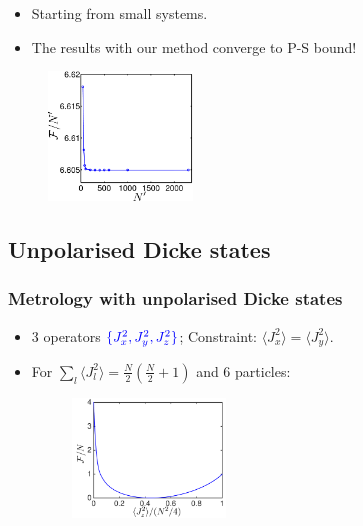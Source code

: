 \documentclass{beamer}
\newcommand{\expect}[1]{\ensuremath{\langle #1 \rangle}}
\begin{document}
		\begin{frame}

			\begin{itemize}
				\item Starting from small systems.
				\vspace{5px}
				\item The results with our method converge to P-S bound!
			\end{itemize}
			\begin{figure}
				\includegraphics[height=130px]{img/scaling-spsq.pdf}
			\end{figure}

		\end{frame}

	\subsection{Unpolarised Dicke states}

		\begin{frame}
			\frametitle{Metrology with unpolarised Dicke states}
			\begin{itemize}
				\item<1-> 3 operators $\color{blue}\{J_x^2,J_y^2,J_z^2\}$; Constraint: $\expect{J_x^2}=\expect{J_y^2}$.
				\vspace{5px}
				\item<2-> For $\sum_l \expect{J_l^2} = \tfrac{N}{2} (\tfrac{N}{2}+1)$ and 6 particles:
				\begin{figure}
					\includegraphics[height=120px]{img/upperboundary-dicke.pdf}
				\end{figure}

			\end{itemize}

		\end{frame}
\end{document}
